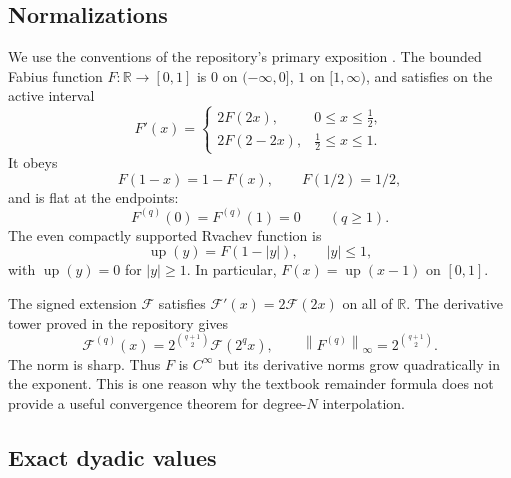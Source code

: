 \documentclass[11pt,oneside]{article}
\theoremstyle{definition}
\theoremstyle{remark}
\newcommand{\R}{\mathbb R}
\newcommand{\Up}{\operatorname{up}}
\newcommand{\Fext}{\mathcal F}
\newcommand{\norm}[1]{\left\lVert #1\right\rVert}
\begin{document}
\subsection{Normalizations}

We use the conventions of the repository's primary exposition \cite{proveit-primary}.  The bounded Fabius function $F:\R\to[0,1]$ is $0$ on $(-\infty,0]$, $1$ on $[1,\infty)$, and satisfies on the active interval
\begin{equation}
 F'(x)=
 \begin{cases}
  2F(2x),&0\le x\le \tfrac12,\\
  2F(2-2x),&\tfrac12\le x\le1.
 \end{cases}
 \label{eq:F-dde}
\end{equation}
It obeys
\begin{equation}
 F(1-x)=1-F(x),\qquad F(1/2)=1/2,
 \label{eq:F-symmetry}
\end{equation}
and is flat at the endpoints:
\begin{equation}
 F^{(q)}(0)=F^{(q)}(1)=0\qquad(q\ge1).
 \label{eq:flatness}
\end{equation}
The even compactly supported Rvachev function is
\begin{equation}
 \Up(y)=F(1-|y|),\qquad |y|\le1,
 \label{eq:up-fold}
\end{equation}
with $\Up(y)=0$ for $|y|\ge1$.  In particular, $F(x)=\Up(x-1)$ on $[0,1]$.

The signed extension $\Fext$ satisfies $\Fext'(x)=2\Fext(2x)$ on all of $\R$.  The derivative tower proved in the repository gives
\begin{equation}
 \Fext^{(q)}(x)=2^{\binom{q+1}{2}}\Fext(2^q x),
 \qquad
 \norm{F^{(q)}}_{\infty}=2^{\binom{q+1}{2}}.
 \label{eq:derivative-tower}
\end{equation}
The norm is sharp.  Thus $F$ is $C^\infty$ but its derivative norms grow quadratically in the exponent.  This is one reason why the textbook remainder formula does not provide a useful convergence theorem for degree-$N$ interpolation.

\subsection{Exact dyadic values}
\end{document}
